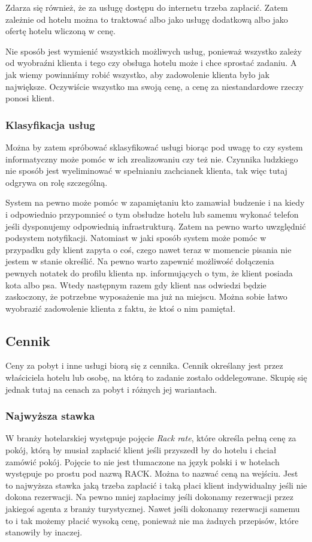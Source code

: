 \documentclass[a4paper,onecolumn,oneside,11pt,wide,floatssmall]{mwrep}
\theoremstyle{definition}
\theoremstyle{plain}%
\theoremstyle{remark}
\begin{document}
Zdarza się również, że za usługę dostępu do internetu trzeba zapłacić. Zatem
zależnie od hotelu można to traktować albo jako usługę dodatkową albo jako
ofertę hotelu wliczoną w cenę.

Nie sposób jest wymienić wszystkich możliwych usług, ponieważ wszystko zależy od
wyobraźni klienta i tego czy obsługa hotelu może i chce sprostać zadaniu. A jak
wiemy powinniśmy robić wszystko, aby zadowolenie klienta było jak największe.
Oczywiście wszystko ma swoją cenę, a cenę za niestandardowe rzeczy ponosi
klient.

\subsubsection{Klasyfikacja usług}
Można by zatem spróbować sklasyfikować usługi biorąc pod uwagę to czy system
informatyczny może pomóc w ich zrealizowaniu czy też nie. Czynnika ludzkiego
nie sposób jest wyeliminować w spełnianiu zachcianek klienta, tak więc tutaj
odgrywa on rolę szczególną.

System na pewno może pomóc w zapamiętaniu kto zamawiał budzenie i na kiedy i
odpowiednio przypomnieć o tym obsłudze hotelu lub samemu wykonać telefon jeśli
dysponujemy odpowiednią infrastrukturą. Zatem na pewno warto uwzględnić
podsystem notyfikacji. Natomiast w jaki sposób system może pomóc w przypadku gdy
klient zapyta o coś, czego nawet teraz w momencie pisania nie jestem w stanie
określić. Na pewno warto zapewnić możliwość dołączenia pewnych notatek do
profilu klienta np. informujących o tym, że klient posiada kota albo psa. Wtedy
następnym razem gdy klient nas odwiedzi będzie zaskoczony, że potrzebne
wyposażenie ma już na miejscu. Można sobie łatwo wyobrazić zadowolenie klienta z
faktu, że ktoś o nim pamiętał. 

\subsection{Cennik}
Ceny za pobyt i inne usługi biorą się z cennika. Cennik określany jest przez
właściciela hotelu lub osobę, na którą to zadanie zostało oddelegowane. Skupię
się jednak tutaj na cenach za pobyt i różnych jej wariantach.

\subsubsection{Najwyższa stawka}
W branży hotelarskiej występuje pojęcie \emph{Rack rate}, które określa pełną
cenę za pokój, którą by musiał zapłacić klient jeśli przyszedł by do hotelu i
chciał zamówić pokój.
Pojęcie to nie jest tłumaczone na język polski i w hotelach występuje po prostu
pod nazwą RACK. Można to nazwać ceną na wejściu. Jest to najwyższa stawka jaką
trzeba zapłacić i taką płaci klient indywidualny jeśli nie dokona rezerwacji. Na
pewno mniej zapłacimy jeśli dokonamy rezerwacji przez jakiegoś agenta z branży turystycznej.
Nawet jeśli dokonamy rezerwacji samemu to i tak możemy płacić wysoką cenę,
ponieważ nie ma żadnych przepisów, które stanowiły by inaczej.
\end{document}
